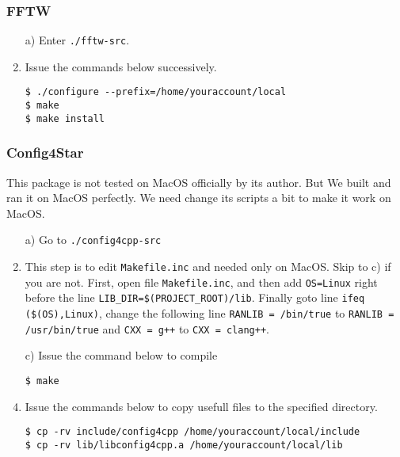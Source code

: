 \documentclass[a4paper,5pt]{article}
\begin{document}
\subsubsection{FFTW}
\begin{enumerate}
\item[a)] Enter \lstinline{./fftw-src}.
\item[b)] Issue the commands below successively.

\lstinline{$ ./configure --prefix=/home/youraccount/local}    \\
\lstinline{$ make}                                            \\
\lstinline{$ make install}
\end{enumerate}

\subsubsection{Config4Star}
This package is not tested on MacOS officially by its author. But We built and ran it on MacOS perfectly. We need change its scripts a bit to make it work on MacOS.

\begin{enumerate}
\item[a)] Go to \lstinline{./config4cpp-src}
\item[b)] This step is to edit \lstinline{Makefile.inc} and needed only on MacOS. Skip to c) if you are not.
First, open file \lstinline{Makefile.inc}, and then add \lstinline{OS=Linux} right before the line \lstinline{LIB_DIR=$(PROJECT_ROOT)/lib}. Finally goto line \lstinline{ifeq ($(OS),Linux)}, change the following line \lstinline{RANLIB = /bin/true} to \lstinline{RANLIB = /usr/bin/true} and \lstinline{CXX = g++} to \lstinline{CXX = clang++}.
\item[c)] Issue the command below to compile

\lstinline{$ make}
\item[d)] Issue the commands below to copy usefull files to the specified directory.

\lstinline{$ cp -rv include/config4cpp /home/youraccount/local/include}        \\
\lstinline{$ cp -rv lib/libconfig4cpp.a /home/youraccount/local/lib}
\end{enumerate}
\end{document}
